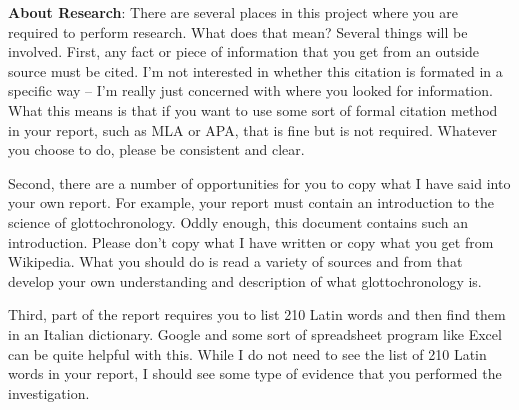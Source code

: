 \documentclass
[justified,nohyper]
{tufte-handout}
\begin{document}
\textbf{About Research}: There are several places in this project where you are required to perform research. What does that mean? Several things will be involved. First, any fact or piece of information that you get from an outside source must be cited. I'm not interested in whether this citation is formated in a specific way -- I'm really just concerned with where you looked for information. What this means is that if you want to use some sort of formal citation method in your report, such as MLA or APA, that is fine but is not required. Whatever you choose to do, please be consistent and clear.

Second, there are a number of opportunities for you to copy what I have said into your own report. For example, your report must contain an introduction to the science of glottochronology. Oddly enough, this document contains such an introduction. Please don't copy what I have written or copy what you get from Wikipedia. What you should do is read a variety of sources and from that develop your own understanding and description of what glottochronology is.

Third, part of the report requires you to list 210 Latin words and then find them in an Italian dictionary. Google and some sort of spreadsheet program like Excel can be quite helpful with this. While I do not need to see the list of 210 Latin words in your report, I should see some type of evidence that you performed the investigation.
\end{document}
